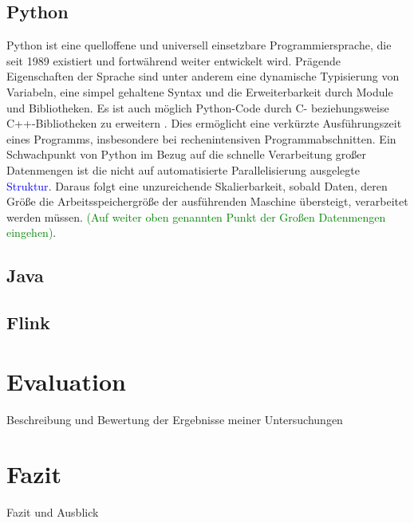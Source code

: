 \section{Python}
Python ist eine quelloffene und universell einsetzbare Programmiersprache, die seit 1989 existiert und fortwährend weiter entwickelt wird. Prägende Eigenschaften der Sprache sind unter anderem eine dynamische Typisierung von Variabeln, eine simpel gehaltene Syntax und die Erweiterbarkeit durch Module und Bibliotheken. Es ist auch möglich Python-Code durch C- beziehungsweise C++-Bibliotheken zu erweitern \cite{Martelli2006}. Dies ermöglicht eine verkürzte Ausführungszeit eines Programms, insbesondere bei rechenintensiven Programmabschnitten. Ein Schwachpunkt von Python im Bezug auf die schnelle Verarbeitung großer Datenmengen ist die nicht auf automatisierte Parallelisierung ausgelegte \textcolor{blue}{Struktur}. Daraus folgt eine unzureichende Skalierbarkeit, sobald Daten, deren Größe die Arbeitsspeichergröße der ausführenden Maschine übersteigt, verarbeitet werden müssen. \textcolor{green}{(Auf weiter oben genannten Punkt der Großen Datenmengen eingehen)}. 
\section{Java}

\section{Flink}

\chapter{Evaluation}
Beschreibung und Bewertung der Ergebnisse meiner Untersuchungen

\chapter{Fazit}
Fazit und Ausblick

